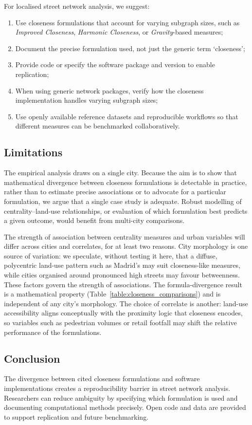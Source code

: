 For localised street network analysis, we suggest:
\begin{enumerate}
  \item Use closeness formulations that account for varying subgraph sizes, such as \emph{Improved Closeness}, \emph{Harmonic Closeness}, or \emph{Gravity}-based measures;
  \item Document the precise formulation used, not just the generic term `closeness';
  \item Provide code or specify the software package and version to enable replication;
  \item When using generic network packages, verify how the closeness implementation handles varying subgraph sizes;
  \item Use openly available reference datasets and reproducible workflows so that different measures can be benchmarked collaboratively.
\end{enumerate}

\subsection{Limitations}

The empirical analysis draws on a single city. Because the aim is to show that mathematical divergence between closeness formulations is detectable in practice, rather than to estimate precise associations or to advocate for a particular formulation, we argue that a single case study is adequate. Robust modelling of centrality--land-use relationships, or evaluation of which formulation best predicts a given outcome, would benefit from multi-city comparisons.

The strength of association between centrality measures and urban variables will differ across cities and correlates, for at least two reasons. City morphology is one source of variation: we speculate, without testing it here, that a diffuse, polycentric land-use pattern such as Madrid's may suit closeness-like measures, while cities organised around pronounced high streets may favour betweenness. These factors govern the strength of associations. The formula-divergence result is a mathematical property (Table~\ref{table:closeness_comparisons}) and is independent of any city's morphology. The choice of correlate is another: land-use accessibility aligns conceptually with the proximity logic that closeness encodes, so variables such as pedestrian volumes or retail footfall may shift the relative performance of the formulations.

\subsection{Conclusion}

The divergence between cited closeness formulations and software implementations creates a reproducibility barrier in street network analysis. Researchers can reduce ambiguity by specifying which formulation is used and documenting computational methods precisely. Open code and data are provided to support replication and future benchmarking.
